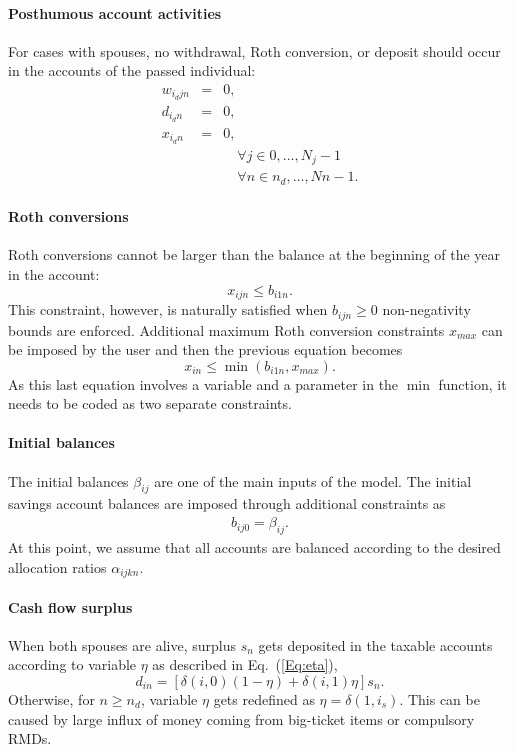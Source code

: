 \documentclass{report}[fleqn,11pt]
\begin{document}
\paragraph*{Posthumous account activities}
	For cases with spouses, no withdrawal, Roth conversion, or deposit should
	occur in the accounts of the passed individual:
	\begin{eqnarray}
		w_{i_djn} &=& 0,\nonumber\\
		d_{i_dn} &=& 0, \nonumber \\
		x_{i_dn} &=& 0, \nonumber \\
		&& \quad \forall j \in {0, \ldots, N_j-1} \nonumber \\
		&& \quad \forall n \in {n_d, \ldots, Nn-1}.
	\end{eqnarray}

\paragraph*{Roth conversions}
	Roth conversions cannot be larger than the balance at the beginning of the year in the account:
	\begin{equation}
		x_{ijn} \le b_{i1n}.
	\end{equation}
	This constraint, however, is naturally satisfied when $b_{ijn} \ge 0$ non-negativity bounds are enforced.
	Additional maximum Roth conversion constraints $x_{max}$ can be imposed by the user and
	then the previous equation becomes
	\begin{equation}
		x_{in} \le \min(b_{i1n}, x_{max}).
	\end{equation}
	As this last equation involves a variable and a parameter in the $\min$ function,
	it needs to be coded as two separate constraints.

\paragraph*{Initial balances}
	The initial balances $\beta_{ij}$ are one of the main inputs of the model.
	The initial savings account balances are imposed through additional constraints as
	\begin{eqnarray}
		\label{Eq:InitialBalance}
		b_{ij0} = \beta_{ij}.
	\end{eqnarray}
	At this point, we assume that all accounts are balanced according to the desired
	allocation ratios $\alpha_{ijkn}$.

\paragraph*{Cash flow surplus}
	When both spouses are alive, surplus $s_n$ gets deposited in the taxable accounts
	according to variable $\eta$ as described in Eq.~(\ref{Eq:eta}),
	\begin{equation}
		\label{Eq:eta2}
		d_{in} = [\delta(i, 0)(1 - \eta) + \delta(i, 1)\eta] s_n .
	\end{equation}
	Otherwise, for $n \ge n_d$, variable $\eta$ gets redefined as $\eta = \delta(1, i_s)$.
	This can be caused by large influx of money coming from big-ticket items or compulsory RMDs.
\end{document}
